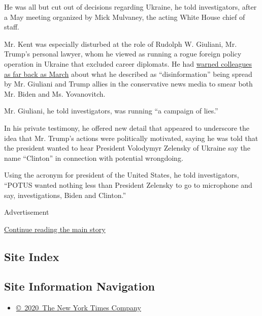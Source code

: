 He was all but cut out of decisions regarding Ukraine, he told
investigators, after a May meeting organized by Mick Mulvaney, the
acting White House chief of staff.

Mr. Kent was especially disturbed at the role of Rudolph W. Giuliani,
Mr. Trump's personal lawyer, whom he viewed as running a rogue foreign
policy operation in Ukraine that excluded career diplomats. He had
\href{https://twitter.com/kenvogel/status/1184146566346661889?lang=en}{warned
colleagues as far back as March} about what he described as
``disinformation'' being spread by Mr. Giuliani and Trump allies in the
conservative news media to smear both Mr. Biden and Ms. Yovanovitch.

Mr. Giuliani, he told investigators, was running ``a campaign of lies.''

In his private testimony, he offered new detail that appeared to
underscore the idea that Mr. Trump's actions were politically motivated,
saying he was told that the president wanted to hear President Volodymyr
Zelensky of Ukraine say the name ``Clinton'' in connection with
potential wrongdoing.

Using the acronym for president of the United States, he told
investigators, ``POTUS wanted nothing less than President Zelensky to go
to microphone and say, investigations, Biden and Clinton.''

Advertisement

\protect\hyperlink{after-bottom}{Continue reading the main story}

\hypertarget{site-index}{%
\subsection{Site Index}\label{site-index}}

\hypertarget{site-information-navigation}{%
\subsection{Site Information
Navigation}\label{site-information-navigation}}

\begin{itemize}
\tightlist
\item
  \href{https://help.nytimes.com/hc/en-us/articles/115014792127-Copyright-notice}{©~2020~The
  New York Times Company}
\end{itemize}


